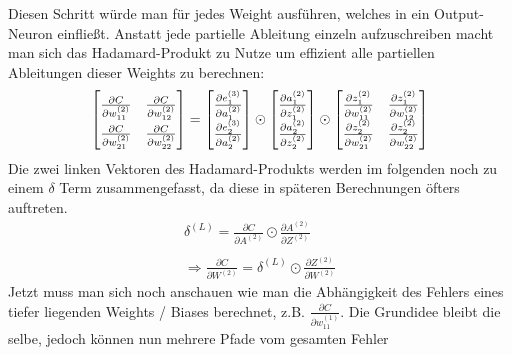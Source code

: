 \noindent
Diesen Schritt würde man für jedes Weight ausführen, welches in ein Output-Neuron einfließt.
Anstatt jede partielle Ableitung einzeln aufzuschreiben macht man sich das Hadamard-Produkt zu Nutze um effizient alle partiellen
Ableitungen dieser Weights zu berechnen:
\begin{align*}
  \renewcommand{\arraystretch}{1.5}
  \begin{bmatrix}
    \frac{\partial C}{\partial w_{11}^{(2)}} & \frac{\partial C}{\partial w_{12}^{(2)}} \\
    \frac{\partial C}{\partial w_{21}^{(2)}} & \frac{\partial C}{\partial w_{22}^{(2)}} \\
  \end{bmatrix} = 
  \begin{bmatrix}
    \frac{\partial e_1^{(3)}}{\partial a_1^{(2)}} \\
    \frac{\partial e_2^{(3)}}{\partial a_2^{(2)}}
  \end{bmatrix} \odot 
  \begin{bmatrix}
    \frac{\partial a_1^{(2)}}{\partial z_1^{(2)}} \\
    \frac{\partial a_2^{(2)}}{\partial z_2^{(2)}}
  \end{bmatrix} \odot
  \begin{bmatrix}
    \frac{\partial z_1^{(2)}}{\partial w_{11}^{(2)}} & \frac{\partial z_1^{(2)}}{\partial w_{12}^{(2)}} \\
    \frac{\partial z_2^{(2)}}{\partial w_{21}^{(2)}} & \frac{\partial z_2^{(2)}}{\partial w_{22}^{(2)}} \\
  \end{bmatrix}
  \renewcommand{\arraystretch}{1}
\end{align*}
\noindent
Die zwei linken Vektoren des Hadamard-Produkts werden im folgenden noch zu einem $\delta$ Term zusammengefasst, da diese in späteren 
Berechnungen öfters auftreten.
\begin{align*}
  \delta^{(L)} = \frac{\partial C}{\partial A^{(2)}} \odot \frac{\partial A^{(2)}}{\partial Z^{(2)}}\\
  \\
  \Rightarrow \frac{\partial C}{\partial W^{(2)}} = \delta^{(L)} \odot \frac{\partial Z^{(2)}}{\partial W^{(2)}}
\end{align*}
\noindent
Jetzt muss man sich noch anschauen wie man die Abhängigkeit des Fehlers eines tiefer liegenden Weights / Biases 
berechnet, z.B. $\frac{\partial C}{\partial w_{11}^{(1)}}$. Die Grundidee bleibt die selbe, jedoch können nun mehrere Pfade vom gesamten Fehler 
